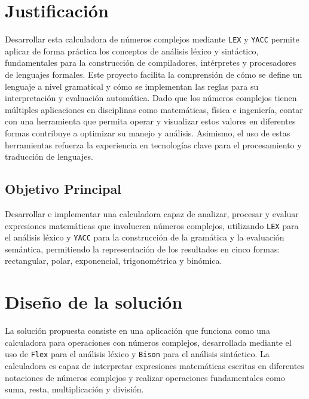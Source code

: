 \documentclass{article}
\begin{document}
\section*{Justificación}

Desarrollar esta calculadora de números complejos mediante \texttt{LEX} y \texttt{YACC} permite aplicar de forma práctica los conceptos de análisis léxico y sintáctico, fundamentales para la construcción de compiladores, intérpretes y procesadores de lenguajes formales. Este proyecto facilita la comprensión de cómo se define un lenguaje a nivel gramatical y cómo se implementan las reglas para su interpretación y evaluación automática. Dado que los números complejos tienen múltiples aplicaciones en disciplinas como matemáticas, física e ingeniería, contar con una herramienta que permita operar y visualizar estos valores en diferentes formas contribuye a optimizar su manejo y análisis. Asimismo, el uso de estas herramientas refuerza la experiencia en tecnologías clave para el procesamiento y traducción de lenguajes.

\subsection{Objetivo Principal}

Desarrollar e implementar una calculadora capaz de analizar, procesar y evaluar expresiones matemáticas que involucren números complejos, utilizando \texttt{LEX} para el análisis léxico y \texttt{YACC} para la construcción de la gramática y la evaluación semántica, permitiendo la representación de los resultados en cinco formas: rectangular, polar, exponencial, trigonométrica y binómica.

\section{Diseño de la solución}\label{sec:dis}

La solución propuesta consiste en una aplicación que funciona como una calculadora para operaciones con números complejos, desarrollada mediante el uso de \texttt{Flex} para el análisis léxico y \texttt{Bison} para el análisis sintáctico. La calculadora es capaz de interpretar expresiones matemáticas escritas en diferentes notaciones de números complejos y realizar operaciones fundamentales como suma, resta, multiplicación y división.
\end{document}
